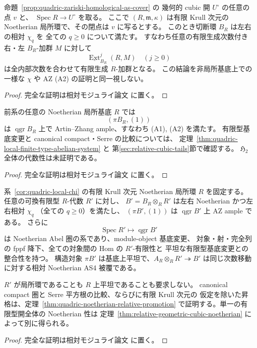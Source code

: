 \begin{corollary}
\label{cor:quadric-local-chi}
命題~\ref{prop:quadric-zariski-homological-as-cover} の
幾何的 cubic 開 $U^\circ$ の任意の点 $v$ と、
$\operatorname{Spec}R\to U^\circ$ を取る。
ここで $(R,\mathfrak m,\kappa)$ は有限 Krull 次元の
Noetherian 局所環で、その閉点は $v$ に写るとする。
このとき切断環 $B_R$ は左右の相対 $\chi_q$ を
全ての $q\ge0$ について満たす。
すなわち任意の有限生成次数付き右・左 $B_R$-加群
$M$ に対して
\[
 \underline{\operatorname{Ext}}_{B_R}^j(R,M)
 \quad(j\ge0)
\]
は全内部次数を合わせて有限生成 $R$-加群となる。
この結論を非局所基底上での一様な
$\chi$ や AZ (A2) の証明と同一視しない。
\end{corollary}
\begin{proof}
完全な証明は相対モジュライ論文 \cite[\texttt{artin_roots}]{QuadricModuli2026} に置く。
\end{proof}

\begin{corollary}
\label{cor:quadric-local-AZ-ampleness}
前系の任意の Noetherian 局所基底 $R$ では
\[
 (\pi B_R,(1))
\]
は $\operatorname{qgr}B_R$ 上で
Artin--Zhang ample、すなわち (A1), (A2) を満たす。
有限型基底変更と canonical compact・Serre の比較については、
定理~\ref{thm:quadric-local-finite-type-abelian-system} と
第\ref{sec:relative-cubic-tails}節で確認する。
$\mathfrak H_2$ 全体の代数性は未証明である。
\end{corollary}
\begin{proof}
完全な証明は相対モジュライ論文 \cite[\texttt{artin_roots}]{QuadricModuli2026} に置く。
\end{proof}

\begin{theorem}
\label{thm:quadric-local-finite-type-abelian-system}
系~\ref{cor:quadric-local-chi} の有限 Krull 次元 Noetherian 局所環
$R$ を固定する。任意の可換有限型 $R$-代数 $R'$ に対し、
$B'=B_R\otimes_RR'$ は左右 Noetherian かつ左右相対 $\chi_q$
（全ての $q\ge0$）を満たし、
$(\pi B',(1))$ は $\operatorname{qgr}B'$ 上 AZ ample である。
さらに
\[
 \operatorname{Spec}R'\longmapsto\operatorname{qgr}B'
 \tag{Local-tails}\label{eq:local-finite-type-tails-system}
\]
は Noetherian Abel 圏の系であり、module-object 基底変更、
対象・射・完全列の fppf 降下、全ての対象間の Hom の $R'$-有限性と
平坦な有限型基底変更との整合性を持つ。
構造対象 $\pi B'$ は基底上平坦で、$A_R\otimes_RR'\twoheadrightarrow B'$
は同じ次数移動に対する相対 Noetherian AS4 被覆である。

$R'$ が局所環であることも $R$ 上平坦であることも要求しない。
canonical compact 圏と Serre 平方根の比較、ならびに有限 Krull 次元の
仮定を除いた昇格は、定理~\ref{thm:quadric-noetherian-relative-promotion}
で証明する。単一の有限型開全体の Noetherian 性は
定理~\ref{thm:relative-geometric-cubic-noetherian} によって別に得られる。
\end{theorem}
\begin{proof}
完全な証明は相対モジュライ論文 \cite[\texttt{artin_roots}]{QuadricModuli2026} に置く。
\end{proof}

